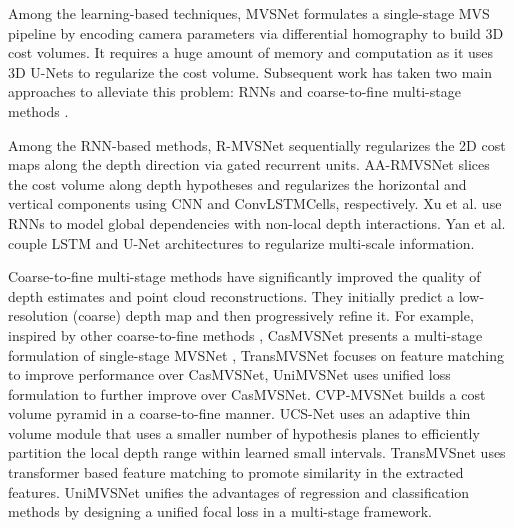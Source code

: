 \documentclass[10pt,twocolumn,letterpaper]{article}
\begin{document}
Among the learning-based techniques, MVSNet \cite{yao2018mvsnet}
formulates a single-stage MVS pipeline by encoding camera parameters
via differential homography to build 3D cost volumes. It requires a huge amount of
memory and computation as it uses 3D U-Nets \cite{olaf2015unet}
to regularize the cost volume. Subsequent work has taken two main
approaches to alleviate this problem: RNNs
\cite{yao2019recurrent, wei2021aa, yan2020dynamicfusion, xu2021nonlocalrecurrent} and 
coarse-to-fine multi-stage methods \cite{xu2019multiscale,
  gu2019casmvsnet, YU2021AAcostvolume, ding2022transmvsnet,
  peng2022rethinkingMVS, Cheng2019USCNet}. 

Among the RNN-based methods, R-MVSNet \cite{yao2019recurrent}
sequentially regularizes the 2D cost maps along the depth direction
via gated recurrent units. AA-RMVSNet \cite{wei2021aa} slices the cost
volume along  depth hypotheses and regularizes the horizontal and
vertical components using CNN and ConvLSTMCells, respectively. Xu
et al. \cite{xu2021nonlocalrecurrent} use RNNs to model global
dependencies with non-local depth interactions. Yan et
al. \cite{yan2020dynamicfusion} couple LSTM and U-Net architectures to
regularize multi-scale information.

Coarse-to-fine multi-stage methods \cite{ding2022transmvsnet,
  peng2022rethinkingMVS, Luo2019Pmvsnet, yao2019recurrent,
  chen2019pointbased, gu2019casmvsnet, yang2019CVPMVS,
  Cheng2019USCNet, wei2021aa} have  significantly improved the
quality of depth estimates and point cloud reconstructions. They  initially predict a low-resolution
(coarse) depth map and then progressively refine it.
For example,
inspired by
other coarse-to-fine methods \cite{tonioni2018realtime,
  wang2018anytimestereo, yin2018hierarchical}, CasMVSNet
\cite{gu2019casmvsnet} presents a multi-stage formulation of
single-stage MVSNet \cite{yao2018mvsnet},
TransMVSNet \cite{ding2022transmvsnet} focuses on feature matching to
improve performance over CasMVSNet, UniMVSNet \cite{peng2022rethinkingMVS} uses 
unified loss formulation to further improve over CasMVSNet. 
CVP-MVSNet \cite{yang2019CVPMVS} builds a cost volume pyramid in a
coarse-to-fine manner.
UCS-Net \cite{gu2019casmvsnet} uses an adaptive thin volume
module that uses a smaller number of hypothesis planes to efficiently
partition the local depth range within learned small
intervals. TransMVSnet \cite{ding2022transmvsnet} uses transformer
based \cite{vaswani2017attention, angelos2020linearattention} feature
matching to promote similarity in the extracted features. UniMVSNet
\cite{peng2022rethinkingMVS} unifies the advantages of regression and
classification methods by designing a unified focal loss in a
multi-stage framework.
\end{document}
